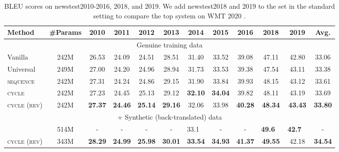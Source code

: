 \documentclass[11pt]{article}
\begin{document}
\begin{table*}[!t]
  \centering{}
  \footnotesize
  \begin{tabular}{ l | c | c c c c c c c c c | c } \hline
  Method & \#Params & 2010 & 2011 & 2012 & 2013 & 2014 & 2015 & 2016 & 2018 & 2019 & Avg. \\ \hline \hline
  \multicolumn{12}{c}{Genuine training data} \\ \hline \hline
  Vanilla & 242M & 26.53 & 24.09 & 24.51 & 28.51 & 31.40 & 33.52 & 39.08 & 47.11 & 42.80 & 33.06 \\
  Universal & 249M & 27.00 & 24.20 & 24.96 & 28.94 & 31.73 & 33.53 & 39.38 & 47.54 & 43.11 & 33.38 \\
  \textsc{sequence} & 242M & 27.31 & 24.24 & 24.86 & 29.15 & 31.90 & 33.84 & 39.93 & 48.15 & 43.12 & 33.61 \\
  \textsc{cycle} & 242M & 27.23 & 24.45 & 25.13 & 29.12 & \textbf{32.10} & \textbf{34.04} & 39.82 & 48.11 & 43.19 & 33.69 \\
  \textsc{cycle (rev)} & 242M & \textbf{27.37} & \textbf{24.46} & \textbf{25.14} & \textbf{29.16} & 32.06 & 33.98 & \textbf{40.28} & \textbf{48.34} & \textbf{43.43} & \textbf{33.80} \\ \hline \hline
  \multicolumn{12}{c}{+ Synthetic (back-translated) data} \\ \hline \hline
  \citet{kiyono-etal-2020-tohoku} & 514M & - & - & - & - & 33.1 \  & - & - & \textbf{49.6} \  & \textbf{42.7} \ & - \\
  \textsc{cycle (rev)} & 343M & \textbf{28.29} & \textbf{24.99} & \textbf{25.98} & \textbf{30.01} & \textbf{33.54} & \textbf{34.93} & \textbf{41.37} & \textbf{49.55} & 42.18 & \textbf{34.54} \\ \hline
  \end{tabular}
  \caption{BLEU scores on newstest2010-2016, 2018, and 2019. We add newstest2018 and 2019 to the set in the standard setting to compare the top system on WMT 2020 \cite{kiyono-etal-2020-tohoku}.\label{tab:exp_wmt2020_result}}
\end{table*}
\end{document}
